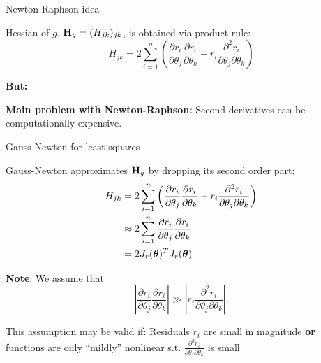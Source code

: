 \documentclass[11pt,compress,t,notes=noshow, xcolor=table]{beamer}
\begin{document}
\begin{framei}{Newton-Raphson idea}
\item Hessian of $g$, $\mathbf{H}_g = (H_{jk})_{jk}$, is obtained via product rule:
$$
H_{jk} = 2 \sum_{i=1}^n \left(\frac{\partial r_i}{\partial \theta_j}\frac{\partial r_i}{\partial \theta_k} + r_i \frac{\partial^2 r_i}{\partial \theta_j \partial \theta_k}\right)
$$
\vfill
\item \textbf{But:}
\begin{center}
\textbf{Main problem with Newton-Raphson:}
Second derivatives can be computationally expensive.
\end{center}
\end{framei}


\begin{framei}{Gauss-Newton for least squares}
\item Gauss-Newton approximates $\mathbf{H}_g$ by dropping its second order part:
$$
\begin{aligned}
H_{jk} &= 2 \sum_{i=1}^n \left(\frac{\partial r_i}{\partial \theta_j}\frac{\partial r_i}{\partial \theta_k} + r_i \frac{\partial^2 r_i}{\partial \theta_j \partial \theta_k}\right) \\
&\approx  2 \sum_{i=1}^n \frac{\partial r_i}{\partial \theta_j}\frac{\partial r_i}{\partial \theta_k} \\
&= 2 J_r(\bm{\theta})^T J_r(\bm{\theta})
\end{aligned}
$$
\item \textbf{Note}: We assume that
$$
\left|\frac{\partial r_i}{\partial \theta_j}\frac{\partial r_i}{\partial \theta_k}\right| \gg \left|r_i \frac{\partial^2 r_i}{\partial \theta_j \partial \theta_k}\right|.
$$
\item This assumption may be valid if:
Residuals $r_i$ are small in magnitude \underline{\textbf{or}} functions are only \enquote{mildly} nonlinear s.t. $\frac{\partial^2 r_i}{\partial \theta_j \partial \theta_k}$ is small
\end{framei}
\end{document}

